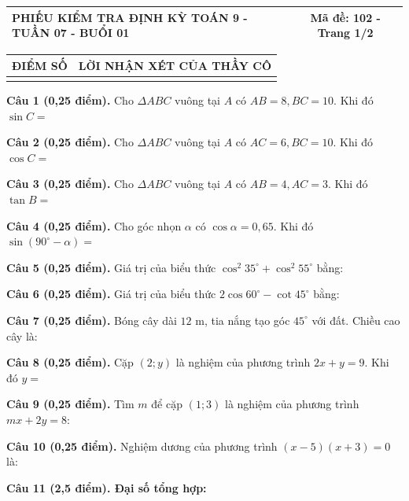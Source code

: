 \documentclass[12pt,a4paper]{article}
\begin{document}
\noindent
\begin{tabularx}{\linewidth}{|X|c|}
\hline
\textbf{PHIẾU KIỂM TRA ĐỊNH KỲ TOÁN 9 - TUẦN 07 - BUỔI 01} & \textbf{Mã đề: 102 - Trang 1/2} \\
\hline
\end{tabularx}

\vspace{1.0mm}

\noindent
\begin{tabularx}{\linewidth}{|p{3.2cm}|X|}
\hline
\centering\textbf{ĐIỂM SỐ} & \centering\textbf{LỜI NHẬN XÉT CỦA THẦY CÔ} \tabularnewline
\hline
\rule{0pt}{1.8cm} & \tabularnewline
\hline
\end{tabularx}

\vspace{1.2mm}
\noindent\textbf{Câu 1 (0,25 điểm).} Cho $\Delta ABC$ vuông tại $A$ có $AB = 8, BC = 10$. Khi đó $\sin C =$ \par\vspace{0.8mm}
\noindent\textbf{Câu 2 (0,25 điểm).} Cho $\Delta ABC$ vuông tại $A$ có $AC = 6, BC = 10$. Khi đó $\cos C =$ \par\vspace{0.8mm}
\noindent\textbf{Câu 3 (0,25 điểm).} Cho $\Delta ABC$ vuông tại $A$ có $AB = 4, AC = 3$. Khi đó $\tan B =$ \par\vspace{0.8mm}
\noindent\textbf{Câu 4 (0,25 điểm).} Cho góc nhọn $\alpha$ có $\cos \alpha = 0{,}65$. Khi đó $\sin(90^\circ - \alpha) =$ \par\vspace{0.8mm}
\noindent\textbf{Câu 5 (0,25 điểm).} Giá trị của biểu thức $\cos^2 35^\circ + \cos^2 55^\circ$ bằng: \par\vspace{0.8mm}
\noindent\textbf{Câu 6 (0,25 điểm).} Giá trị của biểu thức $2\cos 60^\circ - \cot 45^\circ$ bằng: \par\vspace{0.8mm}
\noindent\textbf{Câu 7 (0,25 điểm).} Bóng cây dài $12\text{ m}$, tia nắng tạo góc $45^\circ$ với đất. Chiều cao cây là: \par\vspace{0.8mm}
\noindent\textbf{Câu 8 (0,25 điểm).} Cặp $(2; y)$ là nghiệm của phương trình $2x + y = 9$. Khi đó $y =$ \par\vspace{0.8mm}
\noindent\textbf{Câu 9 (0,25 điểm).} Tìm $m$ để cặp $(1; 3)$ là nghiệm của phương trình $mx + 2y = 8$: \par\vspace{0.8mm}
\noindent\textbf{Câu 10 (0,25 điểm).} Nghiệm dương của phương trình $(x - 5)(x + 3) = 0$ là: \par\vspace{0.8mm}
\vspace{0.8mm}
\noindent\textbf{Câu 11 (2,5 điểm). Đại số tổng hợp:}
\vspace{0.6mm}
\end{document}
